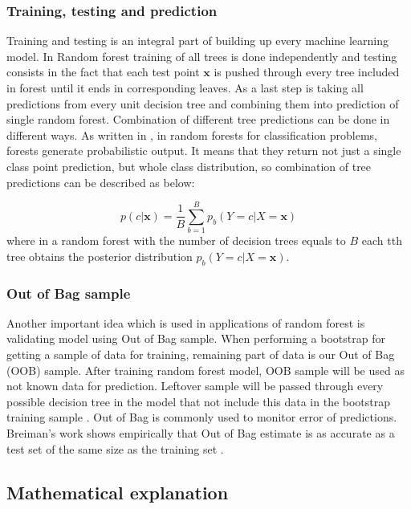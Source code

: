 \subsubsection {Training, testing and prediction}
Training and testing is an integral part of building up every machine learning model.
In Random forest training of all trees is done independently and testing consists in the fact that each test point $\textbf{x}$ is pushed 
through every tree included in forest until it ends in corresponding leaves. As a last step is taking all predictions from 
every unit decision tree and combining them into prediction of single random forest. Combination of different tree predictions 
can be done in different ways. As written in \cite{CGV-035}, in random forests for classification problems, forests generate probabilistic output. 
It means that they return not just a single class point prediction, but whole class distribution, 
so combination of tree predictions can be described as below:

\begin{equation}
	p(c|\textbf{x}) =  \frac{1}{B} \displaystyle\sum_{b=1}^{B} p_{b}(Y = c |X = \textbf{x})
\end{equation}
where in a random forest with the number of decision trees equals to $B$ each tth tree obtains the posterior 
distribution $ p_{b}(Y = c |X = \textbf{x}) $.

\subsubsection {Out of Bag sample}
Another important idea which is used in applications of random forest is validating model using Out of Bag sample.
When performing a bootstrap for getting a sample of data for training,
remaining part of data is our Out of Bag (OOB) sample.
After training random forest model, OOB sample will be used as not known data for prediction.
Leftover sample will be passed through every possible decision tree in the model that not include this
data in the bootstrap training sample \cite{friedman2001elements}. Out of Bag is commonly used to monitor error of predictions. 
Breiman’s work \cite{Breiman1996OUT-OF-BAG-E} shows empirically that Out of Bag estimate is as accurate 
as a test set of the same size as the training set \cite{Breiman1996OUT-OF-BAG-E}.


\subsection{Mathematical explanation}

